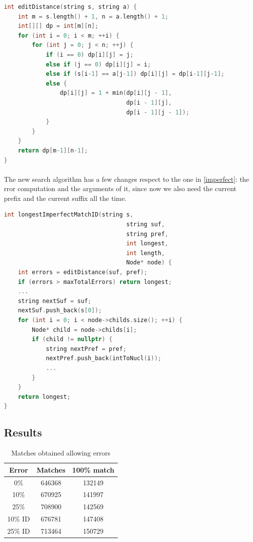 \documentclass[a4paper,10pt]{article}
\begin{document}
\begin{lstlisting}[language=c++, caption=Dynamic programming algorithm to calculate the edit distance between two strings]
int editDistance(string s, string a) {
    int m = s.length() + 1, n = a.length() + 1;
    int[][] dp = int[m][n];
    for (int i = 0; i < m; ++i) {
        for (int j = 0; j < n; ++j) {
            if (i == 0) dp[i][j] = j;
            else if (j == 0) dp[i][j] = i;
            else if (s[i-1] == a[j-1]) dp[i][j] = dp[i-1][j-1];
            else {
                dp[i][j] = 1 + min(dp[i][j - 1],
                                   dp[i - 1][j],   
                                   dp[i - 1][j - 1]);
            }
        }
    }
    return dp[m-1][n-1];
}
\end{lstlisting}

\paragraph{} The new search algorithm has a few changes respect to the one in \ref{imperfect}: the rror computation and the arguments of it, since now we also need the current prefix and the current suffix all the time.

\begin{lstlisting}[language=c++, caption=Dynamic programming algorithm to calculate the edit distance between two strings]
int longestImperfectMatchID(string s,
                                   string suf,
                                   string pref,
                                   int longest,
                                   int length,
                                   Node* node) {
    int errors = editDistance(suf, pref);
    if (errors > maxTotalErrors) return longest;
    ...
    string nextSuf = suf;
    nextSuf.push_back(s[0]);
    for (int i = 0; i < node->childs.size(); ++i) {
        Node* child = node->childs[i];
        if (child != nullptr) {
            string nextPref = pref;
            nextPref.push_back(intToNucl(i));
            ...
        }
    }
    return longest;
}
\end{lstlisting}

\subsection{Results}

\begin{table}[H]
    \centering
    \begin{tabular}{| c | c | c |}
        \hline
        Error & Matches & 100\% match \\
        \hline
        \hline
        0\% & 646368 & 132149 \\
        10\% & 670925 & 141997 \\
        25\% & 708900 & 142569 \\
        10\% ID & 676781 & 147408 \\
        25\% ID & 713464 & 150729 \\
        \hline
    \end{tabular}
    \caption{Matches obtained allowing errors}
\end{table}
\end{document}
